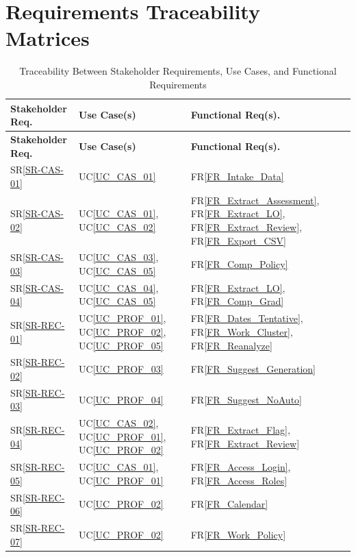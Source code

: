 \documentclass[12pt]{article}
\newcommand{\srref}[1]{SR\ref{#1}}
\newcommand{\ucref}[1]{UC\ref{#1}}
\newcommand{\rref}[1]{FR\ref{#1}}
\begin{document}
\section{Requirements Traceability Matrices} \label{sec_RTM}


{\small
\renewcommand{\arraystretch}{1.2}
\begin{longtable}{>{\raggedright\arraybackslash}p{} >{\raggedright\arraybackslash}p{} >{\raggedright\arraybackslash}p{}}
\toprule
\textbf{Stakeholder Req.} & \textbf{Use Case(s)} & \textbf{Functional Req(s).} \\
\midrule
\endfirsthead
\toprule
\textbf{Stakeholder Req.} & \textbf{Use Case(s)} & \textbf{Functional Req(s).} \\
\midrule
\endhead
\endfoot
\bottomrule
\caption{Traceability Between Stakeholder Requirements, Use Cases, and
Functional Requirements} \label{tab:SR2UC2FRtm}
\endlastfoot
\srref{SR-CAS-01} & \ucref{UC_CAS_01} & \rref{FR_Intake_Data} \\
\srref{SR-CAS-02} & \ucref{UC_CAS_01}, \ucref{UC_CAS_02} & \rref{FR_Extract_Assessment}, \rref{FR_Extract_LO}, \rref{FR_Extract_Review}, \rref{FR_Export_CSV} \\
\srref{SR-CAS-03} & \ucref{UC_CAS_03}, \ucref{UC_CAS_05} & \rref{FR_Comp_Policy} \\
\srref{SR-CAS-04} & \ucref{UC_CAS_04}, \ucref{UC_CAS_05} & \rref{FR_Extract_LO}, \rref{FR_Comp_Grad} \\
\srref{SR-REC-01} & \ucref{UC_PROF_01}, \ucref{UC_PROF_02}, \ucref{UC_PROF_05} & \rref{FR_Dates_Tentative}, \rref{FR_Work_Cluster}, \rref{FR_Reanalyze} \\
\srref{SR-REC-02} & \ucref{UC_PROF_03} & \rref{FR_Suggest_Generation} \\
\srref{SR-REC-03} & \ucref{UC_PROF_04} & \rref{FR_Suggest_NoAuto} \\
\srref{SR-REC-04} & \ucref{UC_CAS_02}, \ucref{UC_PROF_01}, \ucref{UC_PROF_02} & \rref{FR_Extract_Flag}, \rref{FR_Extract_Review} \\
\srref{SR-REC-05} & \ucref{UC_CAS_01}, \ucref{UC_PROF_01} & \rref{FR_Access_Login}, \rref{FR_Access_Roles} \\
\srref{SR-REC-06} & \ucref{UC_PROF_02} & \rref{FR_Calendar} \\
\srref{SR-REC-07} & \ucref{UC_PROF_02} & \rref{FR_Work_Policy} \\
\end{longtable}
}
\end{document}
